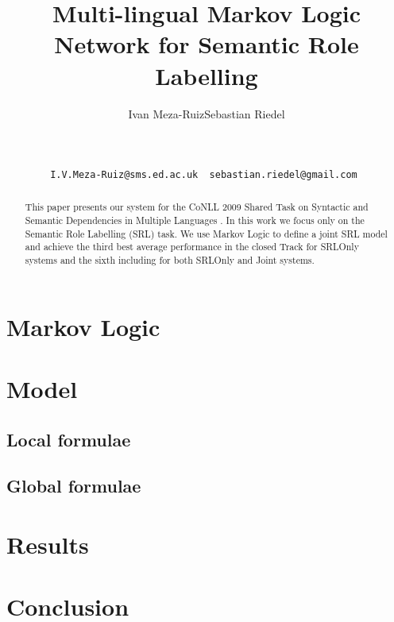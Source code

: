 \documentclass[11pt]{article}
\title{Multi-lingual Markov Logic Network for Semantic Role Labelling}
\author{
Ivan Meza-Ruiz\footnotemark[1]  \qquad Sebastian Riedel\footnotemark[2] 
\footnotemark[3]   \\
\footnotemark[1]  {School of Informatics, University of Edinburgh, UK}\\
\footnotemark[2]  {Department of Computer Science, University of Tokyo, Japan}\\
\footnotemark[3]  {Database Center for Life Science, Research Organization of 
Information and System, Japan}\\
\footnotemark[1]  \tt  I.V.Meza-Ruiz@sms.ed.ac.uk \footnotemark[2] \tt 
sebastian.riedel@gmail.com
}
\date{}
\begin{document}
 



\maketitle
\begin{abstract}
This paper presents our system for the CoNLL 2009 Shared
Task on Syntactic and Semantic Dependencies in Multiple
Languages \citep{CoNLL-2009-ST}. In this work we focus only
on the Semantic Role Labelling (SRL) task. We use Markov Logic to define a joint SRL model and achieve
the third best average performance in the closed Track for SRLOnly systems and 
the sixth including for both SRLOnly and Joint systems.
\end{abstract}
\section{Markov Logic} \label{sec:markovlogic}



\section{Model} \label{sec:model} 


\subsection{Local formulae}\label{sec:local} 
 


\subsection{Global formulae}



\section{Results}\label{sec:results}






\section{Conclusion} \label{sec:conclusion}





\end{document}
